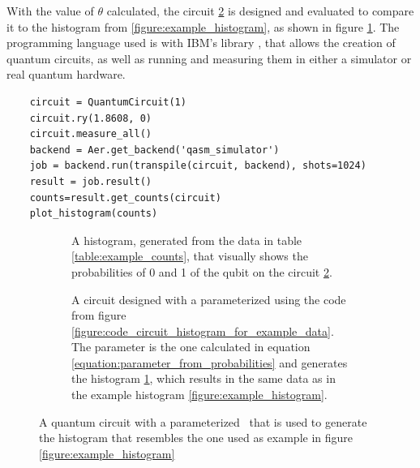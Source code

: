 With the value of $\theta$ calculated, the circuit \ref{figure:circuit_for_histogram} is designed and evaluated to compare it to the histogram from \ref{figure:example_histogram}, as shown in figure \ref{figure:circuit_histogram}. The programming language used is  with IBM's library \cite{Qiskit}, that allows the creation of quantum circuits, as well as running and measuring them in either a simulator or real quantum hardware.


\begin{listing}[!h]
    \centering
    \begin{verbatim}
    circuit = QuantumCircuit(1)
    circuit.ry(1.8608, 0)
    circuit.measure_all()
    backend = Aer.get_backend('qasm_simulator')
    job = backend.run(transpile(circuit, backend), shots=1024)
    result = job.result()
    counts=result.get_counts(circuit)
    plot_histogram(counts)
    \end{verbatim}
    \caption{ code using  to create the circuit represented in figure \ref{figure:circuit_for_histogram}, that is executed and results in the histogram \ref{figure:circuit_histogram}}
    \label{figure:code_circuit_histogram_for_example_data}
\end{listing}

\begin{figure}[!h]
    \begin{subfigure}{.5\textwidth}
        \centering
        \scalebox{\histogramwidth}{
            
        }
        \caption{A histogram, generated from the data in table \ref{table:example_counts}, that visually shows the probabilities of 0 and 1 of the qubit on the circuit \ref{figure:circuit_for_histogram}.}
        \label{figure:circuit_histogram}
    \end{subfigure}
    \begin{subfigure}{.5\textwidth}
        \centering
        \caption{A circuit designed with a parameterized \rygate using the code from figure \ref{figure:code_circuit_histogram_for_example_data}. The parameter is the one calculated in equation \ref{equation:parameter_from_probabilities} and generates the histogram \ref{figure:circuit_histogram}, which results in the same data as in the example histogram \ref{figure:example_histogram}.}
        \label{figure:circuit_for_histogram}
    \end{subfigure}
    \caption{A quantum circuit with a parameterized \rygate\ that is used to generate the histogram that resembles the one used as example in figure \ref{figure:example_histogram}}
    \label{figure:figure_circuit_histogram_rebuilt_from_example}
\end{figure}

